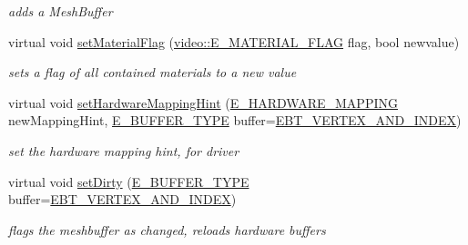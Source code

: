 \begin{DoxyCompactItemize}
\begin{DoxyCompactList}\small\item\em adds a Mesh\+Buffer \end{DoxyCompactList}\item 
\mbox{\label{structirr_1_1scene_1_1SMesh_a0ca30440aef6ca66dfc177b2a0e41e52}} 
virtual void \hyperlink{structirr_1_1scene_1_1SMesh_a0ca30440aef6ca66dfc177b2a0e41e52}{set\+Material\+Flag} (\hyperlink{namespaceirr_1_1video_a8a3bc00ae8137535b9fbc5f40add70d3}{video\+::\+E\+\_\+\+M\+A\+T\+E\+R\+I\+A\+L\+\_\+\+F\+L\+AG} flag, bool newvalue)
\begin{DoxyCompactList}\small\item\em sets a flag of all contained materials to a new value \end{DoxyCompactList}\item 
\mbox{\label{structirr_1_1scene_1_1SMesh_a79839b08062bfcd283e441056bf846e6}} 
virtual void \hyperlink{structirr_1_1scene_1_1SMesh_a79839b08062bfcd283e441056bf846e6}{set\+Hardware\+Mapping\+Hint} (\hyperlink{namespaceirr_1_1scene_ac7d8ee8d77da75f2580bb9bb17231c27}{E\+\_\+\+H\+A\+R\+D\+W\+A\+R\+E\+\_\+\+M\+A\+P\+P\+I\+NG} new\+Mapping\+Hint, \hyperlink{namespaceirr_1_1scene_a8f59a89ffef0ad8e5b2c2cb874a93e8c}{E\+\_\+\+B\+U\+F\+F\+E\+R\+\_\+\+T\+Y\+PE} buffer=\hyperlink{namespaceirr_1_1scene_a8f59a89ffef0ad8e5b2c2cb874a93e8ca34ea664123fbc28610408e51b014dcdd}{E\+B\+T\+\_\+\+V\+E\+R\+T\+E\+X\+\_\+\+A\+N\+D\+\_\+\+I\+N\+D\+EX})
\begin{DoxyCompactList}\small\item\em set the hardware mapping hint, for driver \end{DoxyCompactList}\item 
\mbox{\label{structirr_1_1scene_1_1SMesh_a3ffa0e6294be831ca5be6e6ff9829ca9}} 
virtual void \hyperlink{structirr_1_1scene_1_1SMesh_a3ffa0e6294be831ca5be6e6ff9829ca9}{set\+Dirty} (\hyperlink{namespaceirr_1_1scene_a8f59a89ffef0ad8e5b2c2cb874a93e8c}{E\+\_\+\+B\+U\+F\+F\+E\+R\+\_\+\+T\+Y\+PE} buffer=\hyperlink{namespaceirr_1_1scene_a8f59a89ffef0ad8e5b2c2cb874a93e8ca34ea664123fbc28610408e51b014dcdd}{E\+B\+T\+\_\+\+V\+E\+R\+T\+E\+X\+\_\+\+A\+N\+D\+\_\+\+I\+N\+D\+EX})
\begin{DoxyCompactList}\small\item\em flags the meshbuffer as changed, reloads hardware buffers \end{DoxyCompactList}\item 

\end{DoxyCompactItemize}
